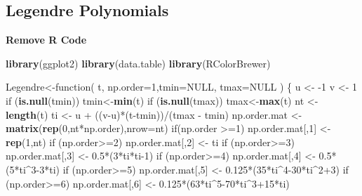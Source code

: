 \documentclass[11pt,]{book}
\newenvironment{Shaded}{\begin{snugshade}}{\end{snugshade}}
\newcommand{\KeywordTok}[1]{\textcolor[rgb]{0.13,0.29,0.53}{\textbf{{#1}}}}
\newcommand{\DataTypeTok}[1]{\textcolor[rgb]{0.13,0.29,0.53}{{#1}}}
\newcommand{\DecValTok}[1]{\textcolor[rgb]{0.00,0.00,0.81}{{#1}}}
\newcommand{\FloatTok}[1]{\textcolor[rgb]{0.00,0.00,0.81}{{#1}}}
\newcommand{\StringTok}[1]{\textcolor[rgb]{0.31,0.60,0.02}{{#1}}}
\newcommand{\OtherTok}[1]{\textcolor[rgb]{0.56,0.35,0.01}{{#1}}}
\newcommand{\NormalTok}[1]{{#1}}
\theoremstyle{definition}
\theoremstyle{definition}
\theoremstyle{remark}
\begin{document}
\subsection{Legendre Polynomials}\label{legendre-polynomials}

\textbf{Remove R Code}

\begin{Shaded}
\begin{Highlighting}[]
\KeywordTok{library}\NormalTok{(ggplot2)}
\KeywordTok{library}\NormalTok{(data.table)}
\KeywordTok{library}\NormalTok{(RColorBrewer)}

\NormalTok{Legendre<-function( t, }\DataTypeTok{np.order=}\DecValTok{1}\NormalTok{,}\DataTypeTok{tmin=}\OtherTok{NULL}\NormalTok{, }\DataTypeTok{tmax=}\OtherTok{NULL} \NormalTok{)}
\NormalTok{\{}
  \NormalTok{u <-}\StringTok{ }\NormalTok{-}\DecValTok{1}
  \NormalTok{v <-}\StringTok{ }\DecValTok{1}
  \NormalTok{if (}\KeywordTok{is.null}\NormalTok{(tmin)) tmin<-}\KeywordTok{min}\NormalTok{(t)}
  \NormalTok{if (}\KeywordTok{is.null}\NormalTok{(tmax)) tmax<-}\KeywordTok{max}\NormalTok{(t)}
  \NormalTok{nt <-}\StringTok{ }\KeywordTok{length}\NormalTok{(t)}
  \NormalTok{ti    <-}\StringTok{ }\NormalTok{u +}\StringTok{ }\NormalTok{((v-u)*(t-tmin))/(tmax -}\StringTok{ }\NormalTok{tmin)}
  \NormalTok{np.order.mat <-}\StringTok{ }\KeywordTok{matrix}\NormalTok{(}\KeywordTok{rep}\NormalTok{(}\DecValTok{0}\NormalTok{,nt*np.order),}\DataTypeTok{nrow=}\NormalTok{nt)}
  \NormalTok{if(np.order >=}\DecValTok{1}\NormalTok{)}
    \NormalTok{np.order.mat[,}\DecValTok{1}\NormalTok{] <-}\StringTok{ }\KeywordTok{rep}\NormalTok{(}\DecValTok{1}\NormalTok{,nt)}
  \NormalTok{if (np.order>=}\DecValTok{2}\NormalTok{)}
    \NormalTok{np.order.mat[,}\DecValTok{2}\NormalTok{] <-}\StringTok{ }\NormalTok{ti}
  \NormalTok{if (np.order>=}\DecValTok{3}\NormalTok{)}
    \NormalTok{np.order.mat[,}\DecValTok{3}\NormalTok{] <-}\StringTok{ }\FloatTok{0.5}\NormalTok{*(}\DecValTok{3}\NormalTok{*ti*ti}\DecValTok{-1}\NormalTok{)}
  \NormalTok{if (np.order>=}\DecValTok{4}\NormalTok{)}
    \NormalTok{np.order.mat[,}\DecValTok{4}\NormalTok{] <-}\StringTok{ }\FloatTok{0.5}\NormalTok{*(}\DecValTok{5}\NormalTok{*ti^}\DecValTok{3-3}\NormalTok{*ti)}
  \NormalTok{if (np.order>=}\DecValTok{5}\NormalTok{)}
    \NormalTok{np.order.mat[,}\DecValTok{5}\NormalTok{] <-}\StringTok{ }\FloatTok{0.125}\NormalTok{*(}\DecValTok{35}\NormalTok{*ti^}\DecValTok{4-30}\NormalTok{*ti^}\DecValTok{2+3}\NormalTok{)}
  \NormalTok{if (np.order>=}\DecValTok{6}\NormalTok{)}
    \NormalTok{np.order.mat[,}\DecValTok{6}\NormalTok{] <-}\StringTok{ }\FloatTok{0.125}\NormalTok{*(}\DecValTok{63}\NormalTok{*ti^}\DecValTok{5-70}\NormalTok{*ti^}\DecValTok{3+15}\NormalTok{*ti)}

\end{Highlighting}
\end{Shaded}
\end{document}
